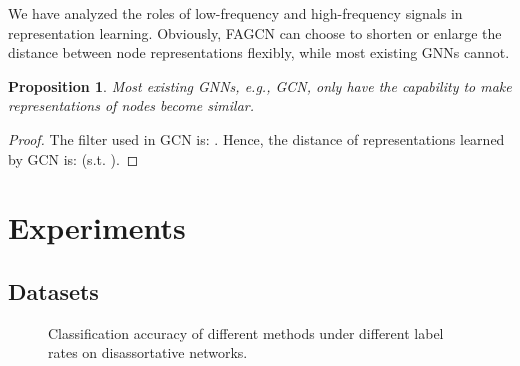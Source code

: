 \documentclass[letterpaper]{article} \usepackage{aaai21}  \usepackage{times}  \usepackage{helvet} \usepackage{courier}  \usepackage[hyphens]{url}  \usepackage{graphicx} \urlstyle{rm} \def\UrlFont{\rm}  \usepackage{natbib}  \usepackage{caption} \frenchspacing  \setlength{\pdfpagewidth}{8.5in}  \setlength{\pdfpageheight}{11in}
\newtheorem{proposition}{Proposition}
\begin{document}
We have analyzed the roles of low-frequency and high-frequency signals in representation learning. Obviously, FAGCN can choose to shorten or enlarge the distance between node representations flexibly, while most existing GNNs cannot.

\begin{proposition}
	Most existing GNNs, e.g., GCN, only have the capability to make representations of nodes become similar.
\end{proposition}

\begin{proof}
	The filter used in GCN is: . 
	Hence, the distance of representations learned by GCN is:  (s.t. ).
\end{proof}
	




\section{Experiments}


\subsection{Datasets}
\label{datasets}

\begin{table}
  \centering
  \caption{The statistics of datasets}
\label{statistic}
\end{table}
    
\begin{figure*}
\centering
{}
\caption{Classification accuracy of different methods under different label rates on disassortative networks.}
\label{disassortative}
\end{figure*}    
\end{document}
